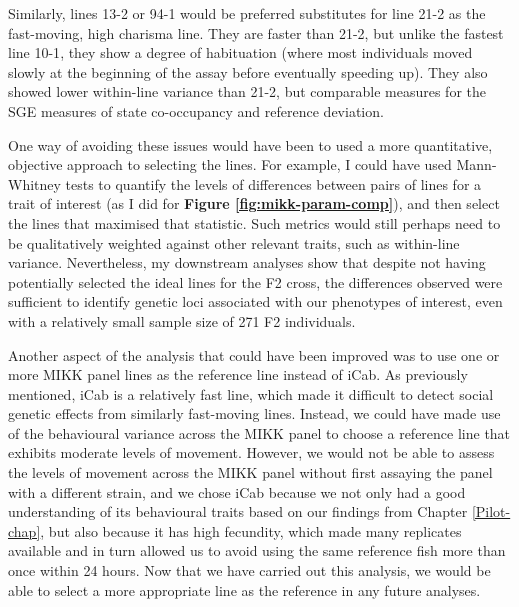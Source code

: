 \documentclass[
]{book}
\begin{document}
Similarly, lines \textcolor{13-2_F57A5F}{13-2} or \textcolor{94-1_D39200}{94-1} would be preferred substitutes for line \textcolor{21-2_49B500}{21-2} as the fast-moving, high charisma line. They are faster than \textcolor{21-2_49B500}{21-2}, but unlike the fastest line \textcolor{10-1_F8766D}{10-1}, they show a degree of habituation (where most individuals moved slowly at the beginning of the assay before eventually speeding up). They also showed lower within-line variance than \textcolor{21-2_49B500}{21-2}, but comparable measures for the SGE measures of state co-occupancy and reference deviation.

One way of avoiding these issues would have been to used a more quantitative, objective approach to selecting the lines. For example, I could have used Mann-Whitney tests to quantify the levels of differences between pairs of lines for a trait of interest (as I did for \textbf{Figure \ref{fig:mikk-param-comp}}), and then select the lines that maximised that statistic. Such metrics would still perhaps need to be qualitatively weighted against other relevant traits, such as within-line variance. Nevertheless, my downstream analyses show that despite not having potentially selected the ideal lines for the F2 cross, the differences observed were sufficient to identify genetic loci associated with our phenotypes of interest, even with a relatively small sample size of 271 F2 individuals.

Another aspect of the analysis that could have been improved was to use one or more MIKK panel lines as the reference line instead of \textcolor{iCab_424B4D}{iCab}. As previously mentioned, \textcolor{iCab_424B4D}{iCab} is a relatively fast line, which made it difficult to detect social genetic effects from similarly fast-moving lines. Instead, we could have made use of the behavioural variance across the MIKK panel to choose a reference line that exhibits moderate levels of movement. However, we would not be able to assess the levels of movement across the MIKK panel without first assaying the panel with a different strain, and we chose \textcolor{iCab_424B4D}{iCab} because we not only had a good understanding of its behavioural traits based on our findings from Chapter \ref{Pilot-chap}, but also because it has high fecundity, which made many replicates available and in turn allowed us to avoid using the same reference fish more than once within 24 hours. Now that we have carried out this analysis, we would be able to select a more appropriate line as the reference in any future analyses.
\end{document}
